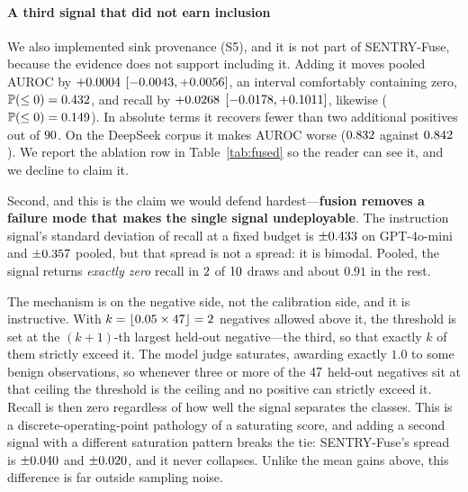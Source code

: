 \documentclass[pdflatex,sn-basic]{sn-jnl}%
\theoremstyle{thmstyleone}
\theoremstyle{thmstyletwo}
\theoremstyle{thmstylethree}
\newcommand{\Prob}{\mathbb{P}}
\begin{document}
\paragraph{A third signal that did not earn inclusion} We also implemented
sink provenance (S5), and it is not part of SENTRY-Fuse, because the evidence
does not support including it. Adding it moves pooled AUROC by $+0.0004$
$[-0.0043, +0.0056]$, an interval comfortably containing zero,
$\Prob(\le 0) = \BootSfiveAurocP$, and recall by $+0.0268$
$[-0.0178, +0.1011]$, likewise ($\Prob(\le 0) = \BootSfiveTprP$). In
absolute terms it recovers fewer than two additional positives out of $90$. On
the DeepSeek corpus it makes AUROC worse ($0.832$ against
$0.842$). We report the ablation row in Table~\ref{tab:fused} so the reader
can see it, and we decline to claim it.

Second, and this is the claim we would defend hardest---\textbf{fusion removes a
failure mode that makes the single signal undeployable}. The instruction signal's
standard deviation of recall at a fixed budget is $\pm 0.433$ on
GPT-4o-mini and $\pm 0.357$ pooled, but that spread is not a spread: it
is bimodal. Pooled, the signal returns \emph{exactly zero} recall in
$2$ of $10$ draws and about $0.91$ in the rest.

The mechanism is on the negative side, not the calibration side, and it is
instructive. With $k = \lfloor 0.05 \times 47 \rfloor = 2$ negatives allowed
above it, the threshold is set at the $(k+1)$-th largest held-out negative---the
third, so that exactly $k$ of them strictly exceed it. The model judge saturates,
awarding exactly $1.0$ to some benign observations, so whenever three or more of
the $47$ held-out negatives sit at that ceiling the threshold is the
ceiling and no positive can strictly exceed it. Recall is then zero regardless of
how well the signal separates the classes. This is a discrete-operating-point
pathology of a saturating score, and adding a second signal with a different
saturation pattern breaks the tie: SENTRY-Fuse's spread is
$\pm 0.040$ and $\pm 0.020$, and it never collapses. Unlike the
mean gains above, this difference is far outside sampling noise.
\end{document}
